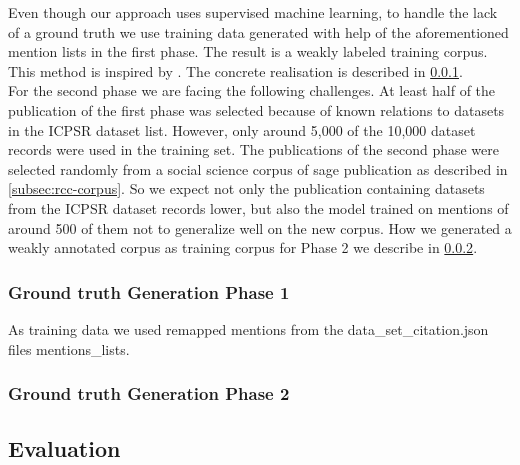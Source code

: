Even though our approach uses supervised machine learning, to handle the lack of a ground truth we use  training data generated with help of the aforementioned mention lists in the first phase. 
The result is a weakly labeled training corpus. This method is inspired by \cite{lee2016bagging}. The concrete realisation is described in \ref{subsec:ground-truth-phase1}.\\
For the second phase we are facing the following challenges.
At least half of the publication of the first phase was selected because of known relations to datasets in the ICPSR dataset list.
However, only around 5,000 of the 10,000 dataset records were used in the training set.
The publications of the second phase were selected randomly from a social science corpus of sage publication as described in \ref{subsec:rcc-corpus}.
So we expect not only the publication containing datasets from the ICPSR dataset records lower, but also the model trained on mentions of around 500 of them not to generalize well on the new corpus.
How we generated a weakly annotated corpus as training corpus for Phase 2 we describe in \ref{subsec:ground-truth-phase2}.



\subsubsection{Ground truth Generation Phase 1}
\label{subsec:ground-truth-phase1}
As training data we used remapped mentions from the data\_set\_citation.json files mentions\_lists.

 
\subsubsection{Ground truth Generation Phase 2}
\label{subsec:ground-truth-phase2}
 
\subsection{Evaluation}
